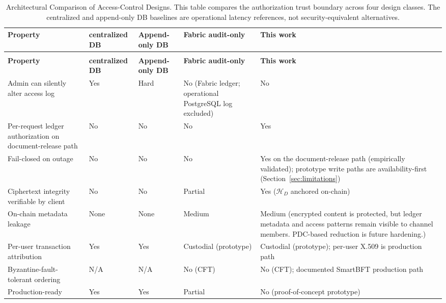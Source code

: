 \documentclass[preprint,12pt]{elsarticle}
\begin{document}
\begingroup
\footnotesize
\renewcommand{\arraystretch}{1.18}
\setlength{\tabcolsep}{4pt}
\begin{xltabular}{\textwidth}{|>{\RaggedRight\arraybackslash}p{3.05cm}|>{\RaggedRight\arraybackslash}X|>{\RaggedRight\arraybackslash}X|>{\RaggedRight\arraybackslash}X|>{\RaggedRight\arraybackslash}X|}
\caption{Architectural Comparison of Access-Control Designs.
This table compares the authorization trust boundary across four
design classes. The centralized and append-only DB baselines are operational latency references, not security-equivalent alternatives.}
\label{tab:arch_comparison}\\
\hline
\textbf{Property} &
\textbf{centralized DB} &
\textbf{Append-only DB} &
\textbf{Fabric audit-only} &
\textbf{This work} \\
\hline
\endfirsthead
{}\\
\hline
\textbf{Property} &
\textbf{centralized DB} &
\textbf{Append-only DB} &
\textbf{Fabric audit-only} &
\textbf{This work} \\
\hline
\endhead
\hline
\endfoot
\endlastfoot
Admin can silently alter access log &
Yes &
Hard &
No (Fabric ledger; operational PostgreSQL log excluded) &
No \\
\hline
Per-request ledger authorization on document-release path &
No &
No &
No &
Yes \\
\hline
Fail-closed on outage &
No &
No &
No &
Yes on the document-release path (empirically validated); prototype write paths are availability-first (Section~\ref{sec:limitations}) \\
\hline
Ciphertext integrity verifiable by client &
No &
No &
Partial &
Yes ($\mathcal{H}_D$ anchored on-chain) \\
\hline
On-chain metadata leakage &
None &
None &
Medium &
Medium (encrypted content is protected, but ledger metadata and access patterns
remain visible to channel members. PDC-based reduction is future hardening.) \\
\hline
Per-user transaction attribution &
Yes &
Yes &
Custodial (prototype) &
Custodial (prototype); per-user X.509 is production path \\
\hline
Byzantine-fault-tolerant ordering &
N/A &
N/A &
No (CFT) &
No (CFT); documented SmartBFT production path~\cite{fabricWhatsNew3x,fabricOrderingServiceLatest} \\
\hline
Production-ready &
Yes &
Yes &
Partial &
No (proof-of-concept prototype) \\
\hline
\end{xltabular}
\endgroup
\end{document}
